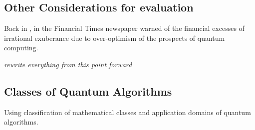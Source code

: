 \subsection{Other Considerations for evaluation}

Back in \citeyear{Ft:Gourianov:2022} \citeauthor{Ft:Gourianov:2022}, in the Financial Times newspaper \cite{Ft:Gourianov:2022}
warned of the financial excesses of irrational exuberance due to over-optimism of the prospects of quantum computing.  

\emph{rewrite everything from this point forward}

\subsection{Classes of Quantum Algorithms}

Using \citeauthor{Arnault:2024} \citeyear{Arnault:2024} \cite{Arnault:2024} classification of mathematical classes
and application domains of quantum algorithms.

